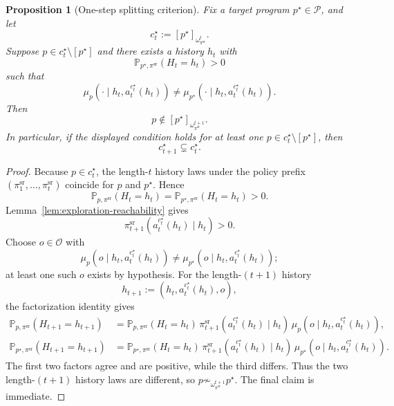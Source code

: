 \documentclass[11pt]{article}
\newtheorem{proposition}[theorem]{Proposition}
\theoremstyle{definition}
\theoremstyle{remark}
\newcommand{\Ocal}{\mathcal{O}}
\newcommand{\Pcal}{\mathcal{P}}
\newcommand{\Prob}{\mathbb{P}}
\begin{document}
\begin{proposition}[One-step splitting criterion]
\label{prop:self-ref-one-step-split}
Fix a target program $p^\star\in\Pcal$, and let
\[
c_t^\star:=[p^\star]_{\omega_{\pi^{\mathrm{sr}}}^t}.
\]
Suppose $p\in c_t^\star\setminus[p^\star]$ and there exists a history $h_t$ with
\[
\Prob_{p^\star,\pi^{\mathrm{sr}}}(H_t=h_t)>0
\]
such that
\[
\mu_p(\cdot\mid h_t,a_t^{c_t^\star}(h_t))
\neq
\mu_{p^\star}(\cdot\mid h_t,a_t^{c_t^\star}(h_t)).
\]
Then
\[
p\notin [p^\star]_{\omega_{\pi^{\mathrm{sr}}}^{t+1}}.
\]
In particular, if the displayed condition holds for at least one $p\in c_t^\star\setminus[p^\star]$, then
\[
c_{t+1}^\star\subsetneq c_t^\star.
\]
\end{proposition}

\begin{proof}
Because $p\in c_t^\star$, the length-$t$ history laws under the policy prefix $(\pi_1^{\mathrm{sr}},\dots,\pi_t^{\mathrm{sr}})$ coincide for $p$ and $p^\star$. Hence
\[
\Prob_{p,\pi^{\mathrm{sr}}}(H_t=h_t)=\Prob_{p^\star,\pi^{\mathrm{sr}}}(H_t=h_t)>0.
\]
Lemma~\ref{lem:exploration-reachability} gives
\[
\pi_{t+1}^{\mathrm{sr}}(a_t^{c_t^\star}(h_t)\mid h_t)>0.
\]
Choose $o\in\Ocal$ with
\[
\mu_p(o\mid h_t,a_t^{c_t^\star}(h_t))
\neq
\mu_{p^\star}(o\mid h_t,a_t^{c_t^\star}(h_t));
\]
at least one such $o$ exists by hypothesis. For the length-$(t+1)$ history
\[
h_{t+1}:=(h_t,a_t^{c_t^\star}(h_t),o),
\]
the factorization identity gives
\begin{align*}
\Prob_{p,\pi^{\mathrm{sr}}}(H_{t+1}=h_{t+1})
&=
\Prob_{p,\pi^{\mathrm{sr}}}(H_t=h_t)\,
\pi_{t+1}^{\mathrm{sr}}(a_t^{c_t^\star}(h_t)\mid h_t)\,
\mu_p(o\mid h_t,a_t^{c_t^\star}(h_t)),\\
\Prob_{p^\star,\pi^{\mathrm{sr}}}(H_{t+1}=h_{t+1})
&=
\Prob_{p^\star,\pi^{\mathrm{sr}}}(H_t=h_t)\,
\pi_{t+1}^{\mathrm{sr}}(a_t^{c_t^\star}(h_t)\mid h_t)\,
\mu_{p^\star}(o\mid h_t,a_t^{c_t^\star}(h_t)).
\end{align*}
The first two factors agree and are positive, while the third differs. Thus the two length-$(t+1)$ history laws are different, so $p\not\sim_{\omega_{\pi^{\mathrm{sr}}}^{t+1}}p^\star$. The final claim is immediate.
\end{proof}
\end{document}
